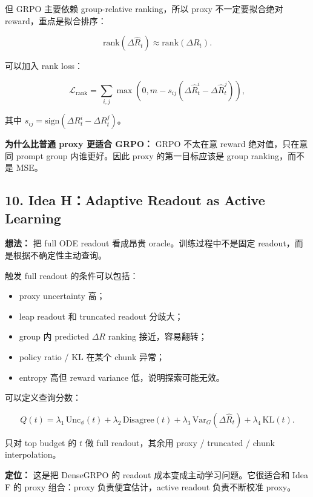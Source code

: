 但 GRPO 主要依赖 group-relative ranking，所以 proxy 不一定要拟合绝对 reward，重点是拟合排序：

\[
\mathrm{rank}(\Delta \hat{R}_t)
\approx
\mathrm{rank}(\Delta R_t).
\]

可以加入 rank loss：

\[
\mathcal{L}_{\mathrm{rank}}
=
\sum_{i,j}
\max\left(0,
 m - s_{ij}(\Delta \hat{R}^i_t-\Delta \hat{R}^j_t)
\right),
\]

其中 \(s_{ij}=\mathrm{sign}(\Delta R^i_t-\Delta R^j_t)\)。

\begin{summarybox}
\textbf{为什么比普通 proxy 更适合 GRPO：} GRPO 不太在意 reward 绝对值，只在意同 prompt group 内谁更好。因此 proxy 的第一目标应该是 group ranking，而不是 MSE。
\end{summarybox}

\subsection{10. Idea H：Adaptive Readout as Active Learning}

\textbf{想法：} 把 full ODE readout 看成昂贵 oracle。训练过程中不是固定 readout，而是根据不确定性主动查询。

触发 full readout 的条件可以包括：

\begin{itemize}[leftmargin=1.5em]
  \item proxy uncertainty 高；
  \item leap readout 和 truncated readout 分歧大；
  \item group 内 predicted \(\Delta R\) ranking 接近，容易翻转；
  \item policy ratio / KL 在某个 chunk 异常；
  \item entropy 高但 reward variance 低，说明探索可能无效。
\end{itemize}

可以定义查询分数：

\[
Q(t)
=
\lambda_1\,\mathrm{Unc}_{\phi}(t)
+\lambda_2\,\mathrm{Disagree}(t)
+\lambda_3\,\mathrm{Var}_{G}(\Delta \hat{R}_t)
+\lambda_4\,\mathrm{KL}(t).
\]

只对 top budget 的 \(t\) 做 full readout，其余用 proxy / truncated / chunk interpolation。

\begin{summarybox}
\textbf{定位：} 这是把 DenseGRPO 的 readout 成本变成主动学习问题。它很适合和 Idea F 的 proxy 组合：proxy 负责便宜估计，active readout 负责不断校准 proxy。
\end{summarybox}

